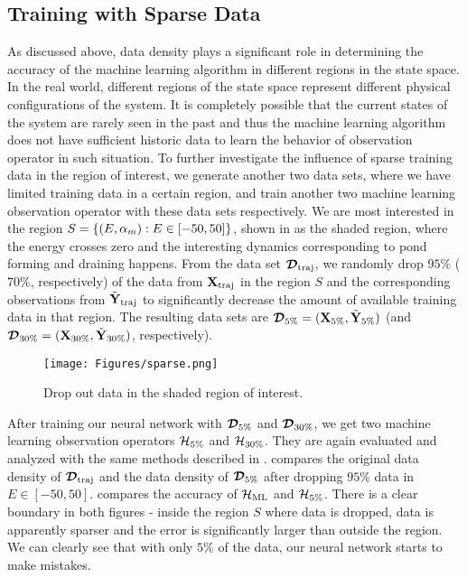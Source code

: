\subsection{Training with Sparse Data}\label{sec:sparsedata}
\par As discussed above, data density plays a significant role in determining the accuracy of the machine learning algorithm in different regions in the state space. In the real world, different regions of the state space represent different physical configurations of the system. It is completely possible that the current states of the system are rarely seen in the past and thus the machine learning algorithm does not have sufficient historic data to learn the behavior of observation operator in such situation. To further investigate the influence of sparse training data in the region of interest, we generate another two data sets, where we have limited training data in a certain region, and train another two machine learning observation operator with these data sets respectively. We are most interested in the region $S=\{(E,\alpha_m):E\in[-50,50]\}$, shown in  as the shaded region, where the energy crosses zero and the interesting dynamics corresponding to pond forming and draining happens. From the data set $\bm{\mathcal{D}}_{\text{traj}}$, we randomly drop $95\%$ ($70\%$, respectively) of the data from $\textbf{X}_{\text{traj}}$ in the region $S$ and the corresponding observations from $\tilde{\textbf{Y}}_{\text{traj}}$ to significantly decrease the amount of available training data in that region. The resulting data sets are $\bm{\mathcal{D}}_{5\%}=(\textbf{X}_{5\%},\tilde{\textbf{Y}}_{5\%})$ (and $\bm{\mathcal{D}}_{30\%}=(\textbf{X}_{30\%},\tilde{\textbf{Y}}_{30\%})$, respectively).

\begin{figure}\label{fig:sparsephase}
\begin{center}
\texttt{[image: Figures/sparse.png]} 
\end{center}
\caption{Drop out data in the shaded region of interest.}
\end{figure}

\par After training our neural network with $\bm{\mathcal{D}}_{5\%}$ and $\bm{\mathcal{D}}_{30\%}$, we get two machine learning observation operators $\mathcal{H}_{5\%}$ and $\mathcal{H}_{30\%}$. They are again evaluated and analyzed with the same methods described in .  compares the original data density of $\bm{\mathcal{D}}_{\text{traj}}$ and the data density of $\bm{\mathcal{D}}_{5\%}$ after dropping $95\%$ data in $E\in[-50,50]$.  compares the accuracy of $\mathcal{H}_{\text{ML}}$ and $\mathcal{H}_{5\%}$. There is a clear boundary in both figures - inside the region $S$ where data is dropped, data is apparently sparser and the error is significantly larger than outside the region. We can clearly see that with only $5\%$ of the data, our neural network starts to make mistakes.

